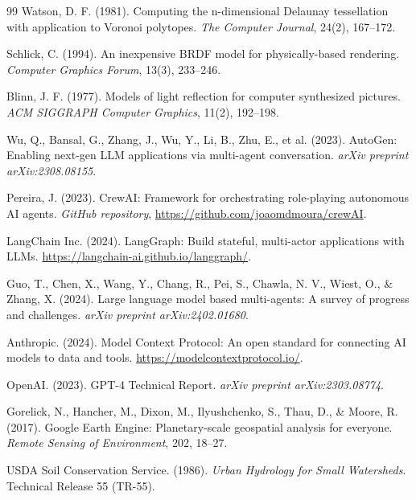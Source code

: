 \documentclass[11pt, a4paper]{article}
\begin{document}
\begin{thebibliography}{99}
 Watson, D. F. (1981). Computing the n-dimensional Delaunay tessellation with application to Voronoi polytopes. \textit{The Computer Journal}, 24(2), 167--172.

 Schlick, C. (1994). An inexpensive BRDF model for physically-based rendering. \textit{Computer Graphics Forum}, 13(3), 233--246.

 Blinn, J. F. (1977). Models of light reflection for computer synthesized pictures. \textit{ACM SIGGRAPH Computer Graphics}, 11(2), 192--198.

 Wu, Q., Bansal, G., Zhang, J., Wu, Y., Li, B., Zhu, E., et al. (2023). AutoGen: Enabling next-gen LLM applications via multi-agent conversation. \textit{arXiv preprint arXiv:2308.08155}.

 Pereira, J. (2023). CrewAI: Framework for orchestrating role-playing autonomous AI agents. \textit{GitHub repository}, \url{https://github.com/joaomdmoura/crewAI}.

 LangChain Inc. (2024). LangGraph: Build stateful, multi-actor applications with LLMs. \url{https://langchain-ai.github.io/langgraph/}.

 Guo, T., Chen, X., Wang, Y., Chang, R., Pei, S., Chawla, N. V., Wiest, O., \& Zhang, X. (2024). Large language model based multi-agents: A survey of progress and challenges. \textit{arXiv preprint arXiv:2402.01680}.

 Anthropic. (2024). Model Context Protocol: An open standard for connecting AI models to data and tools. \url{https://modelcontextprotocol.io/}.

 OpenAI. (2023). GPT-4 Technical Report. \textit{arXiv preprint arXiv:2303.08774}.

 Gorelick, N., Hancher, M., Dixon, M., Ilyushchenko, S., Thau, D., \& Moore, R. (2017). Google Earth Engine: Planetary-scale geospatial analysis for everyone. \textit{Remote Sensing of Environment}, 202, 18--27.

 USDA Soil Conservation Service. (1986). \textit{Urban Hydrology for Small Watersheds}. Technical Release 55 (TR-55).

\end{thebibliography}
\end{document}
